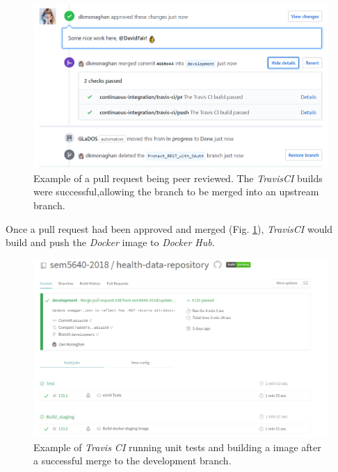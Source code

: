 \begin{figure}[H]
    \centering
    \includegraphics[width=\textwidth]{Images/approve_pr.png}
    \caption{Example of a pull request being peer reviewed. The \textit{TravisCI} builds were successful,allowing the branch to be merged into an upstream branch.}
    \label{fig:approve_pull_request}
\end{figure}

Once a pull request had been approved and merged (Fig. \ref{fig:approve_pull_request}), \textit{TravisCI} would build and push the \textit{Docker} image to \textit{Docker Hub}.

\begin{figure}[H]
    \centering
    \includegraphics[width=\textwidth]{Images/travis_builds_overview.png}
    \caption{Example of \textit{Travis CI} running unit tests and building a  image after a successful merge to the development branch.}
    \label{fig:travis_ui}
\end{figure}

